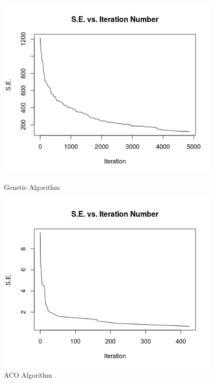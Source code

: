 \documentclass[11pt,a4paper,final]{article}
\begin{document}
	\begin{figure}[H]
		\begin{minipage}{.5\textwidth}
			\centering
			\includegraphics[scale= 0.4]{eli101GAPlot}
			\caption{Genetic Algorithm}
			\label{fig:eli101GA}
		\end{minipage}
		\begin{minipage}{.5\textwidth}
			\centering
			\includegraphics[scale=0.4]{eli101ACOPlot}
			\caption{ACO Algorithm}					
			\label{fig:eli101ACO}
		\end{minipage}
	\end{figure}		
\end{document}

